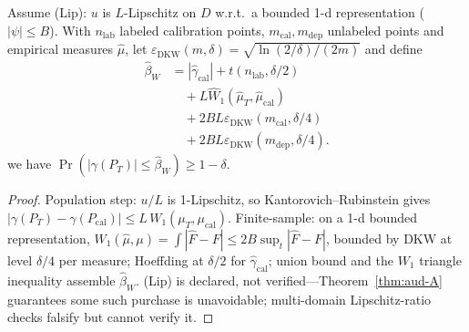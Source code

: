 \begin{theorem}\label{thm:aud-C}
Assume \textup{(Lip)}: $u$ is $L$-Lipschitz on $D$ w.r.t.\ a bounded 1-d representation
($|\psi|\le B$). With $n_{\mathrm{lab}}$ labeled calibration points, $m_{\mathrm{cal}},
m_{\mathrm{dep}}$ unlabeled points and empirical measures $\widehat\mu$, let
$\varepsilon_{\mathrm{DKW}}(m,\delta)=\sqrt{\ln(2/\delta)/(2m)}$ and define
\begin{align*}
\widehat\beta_{W}
&=|\widehat\gamma_{\mathrm{cal}}|+t(n_{\mathrm{lab}},\delta/2)\\
&\quad+L\widehat W_1(\widehat\mu_T,\widehat\mu_{\mathrm{cal}})\\
&\quad+2BL\varepsilon_{\mathrm{DKW}}(m_{\mathrm{cal}},\delta/4)\\
&\quad+2BL\varepsilon_{\mathrm{DKW}}(m_{\mathrm{dep}},\delta/4).
\end{align*}
we have $\Pr(|\gamma(P_T)|\le\widehat\beta_{W})\ge1-\delta$.
\end{theorem}
\begin{proof}
Population step: $u/L$ is 1-Lipschitz, so Kantorovich--Rubinstein gives
$|\gamma(P_T)-\gamma(P_{\mathrm{cal}})|\le L\,W_1(\mu_T,\mu_{\mathrm{cal}})$. Finite-sample:
on a 1-d bounded representation, $W_1(\widehat\mu,\mu)=\int|\widehat F-F|\le
2B\sup_t|\widehat F-F|$, bounded by DKW at level $\delta/4$ per measure; Hoeffding at
$\delta/2$ for $\widehat\gamma_{\mathrm{cal}}$; union bound and the $W_1$ triangle inequality
assemble $\widehat\beta_W$. \textup{(Lip)} is declared, not verified---Theorem~\ref{thm:aud-A}
guarantees some such purchase is unavoidable; multi-domain Lipschitz-ratio checks falsify but
cannot verify it.
\end{proof}


